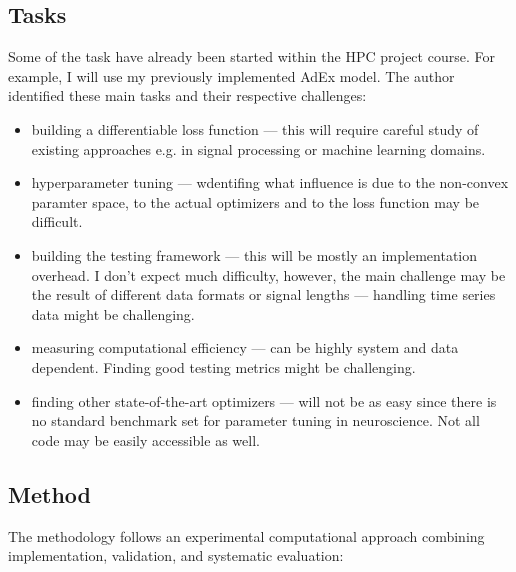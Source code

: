 \documentclass{article}
\begin{document}
\subsection{Tasks}
Some of the task have already been started within the HPC project course.
For example, I will use my previously implemented AdEx model.
The author identified these main tasks and their respective challenges:
\begin{itemize}
  \item building a differentiable loss function --- this will require careful study of existing approaches e.g.
    in signal processing or machine learning domains.
  \item hyperparameter tuning --- wdentifing what influence is due to the non-convex paramter space, to the actual optimizers and to the loss function may be difficult.
  \item building the testing framework --- this will be mostly an implementation overhead. I don't expect much difficulty, however, the main challenge may be the result of different data formats or signal lengths --- handling time series data might be challenging.
  \item measuring computational efficiency --- can be highly system and data dependent. Finding good testing metrics might be challenging.
  \item finding other state-of-the-art optimizers --- will not be as easy since there is no standard benchmark set for parameter tuning in neuroscience. Not all code may be easily accessible as well.
\end{itemize}

\subsection{Method}

The methodology follows an experimental computational approach combining implementation, validation, and systematic evaluation:
\end{document}
